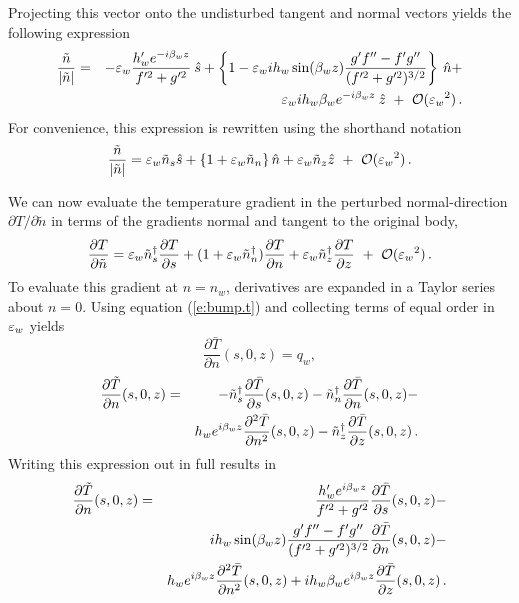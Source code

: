 %
Projecting this vector onto the undisturbed tangent and normal vectors yields
the following expression
%
\begin{eqnarray}
\frac{\tilde n}{|\tilde n|} &=& 
    -{\varepsilon_w} \frac{h'_w e^{-i {\beta_{w}} z}}{f'^2 + g'^2} \: \hat s +
    \left\{ 1 - {\varepsilon_w} i h_w \sin({\beta_{w}} z) 
    \frac{g'f''-f'g''}{(f'^2 + g'^2)^{3/2}} \right\} \: \hat n +  \nonumber \\
& & {\varepsilon_w} i h_w {\beta_{w}} e^{-i {\beta_{w}} z} \: \hat z \ + \ {\cal O}({\varepsilon_w}^2) {\, .}
\end{eqnarray}
%
For convenience, this expression is rewritten using the shorthand notation
%
\begin{equation}
\frac{\tilde n}{|\tilde n|} = 
    {\varepsilon_w} \tilde n_s \hat s +
    \left\{ 1 + {\varepsilon_w} \tilde n_n \right\} \hat n +
    {\varepsilon_w} \tilde n_z \hat z \ + \ {\cal O}({\varepsilon_w}^2) {\, .}
\end{equation}

We can now evaluate the temperature gradient in the perturbed normal-direction
$\partial T / \partial \tilde n$ in terms of the gradients normal and tangent
to the original body,
%
\begin{equation}
\frac{\partial T}{\partial \tilde n} = 
  \ew \tilde n^\dagger_s \frac{\partial T}{\partial s} +
  (1 + \ew \tilde n^\dagger_n) \frac{\partial T}{\partial n} +
  \ew \tilde n^\dagger_z \frac{\partial T}{\partial z} \ + \ 
  \O(\ew^2) \period
\end{equation}
%
To evaluate this gradient at $n=n_w$, derivatives are expanded in a Taylor
series about $n=0$.  Using equation (\ref{e:bump.t}) and collecting terms of
equal order in ${\varepsilon_w}$ yields
%
\begin{equation}
  \frac{\partial \bar T}{\partial n}(s,0,z) = q_w \comma
\end{equation}
%
\begin{eqnarray}
  \frac{\partial \tilde T}{\partial n}(s,0,z) &=& 
      -\tilde n^\dagger_s \frac{\partial \bar T}{\partial s}(s,0,z) -
       \tilde n^\dagger_n \frac{\partial \bar T}{\partial n}(s,0,z) - 
  \nonumber\\
   & & h_w e^{i {\beta_{w}} z} \frac{\partial^2 \bar T}{\partial n^2}(s,0,z) -
       \tilde n^\dagger_z \frac{\partial \bar T}{\partial z}(s,0,z) {\, .}
\end{eqnarray}
%
Writing this expression out in full results in
%
\begin{eqnarray} \label{e:bump.tn}
  \frac{\partial \tilde T}{\partial n}(s,0,z) &=& 
         \frac{h'_w e^{i {\beta_{w}} z}}{f'^2 + g'^2} 
         \frac{\partial \bar T}{\partial s}(s,0,z)  - \nonumber \\
     & & i h_w \sin({\beta_{w}} z)\frac{g'f''-f'g''}{(f'^2 + g'^2)^{3/2}}
         \frac{\partial \bar T}{\partial n}(s,0,z) - \nonumber \\
     & & h_w e^{i {\beta_{w}} z} \frac{\partial^2 \bar T}{\partial n^2}(s,0,z) +
         i h_w {\beta_{w}} e^{i {\beta_{w}} z}
         \frac{\partial \bar T}{\partial z}(s,0,z) {\, .}
\end{eqnarray}

